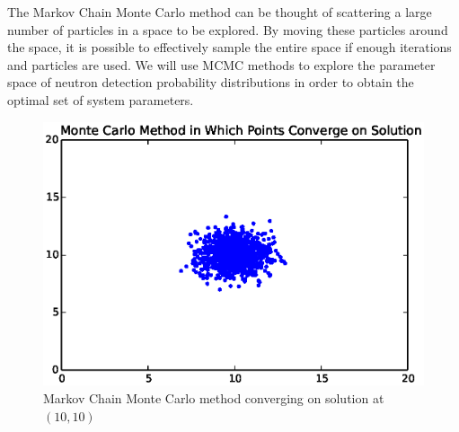 The Markov Chain Monte Carlo method can be thought of scattering a large number of particles in a space to be explored. By moving these particles around the space, it is possible to effectively sample the entire space if enough iterations and particles are used. We will use MCMC methods to explore the parameter space of neutron detection probability distributions in order to obtain the optimal set of system parameters. 
\begin{figure}[ht!]
\centering
\includegraphics[scale=1.0]{Figures/mcmc.eps}
\caption{Markov Chain Monte Carlo method converging on solution at $(10,10)$}
\label{fig:mcmc}
\end{figure}